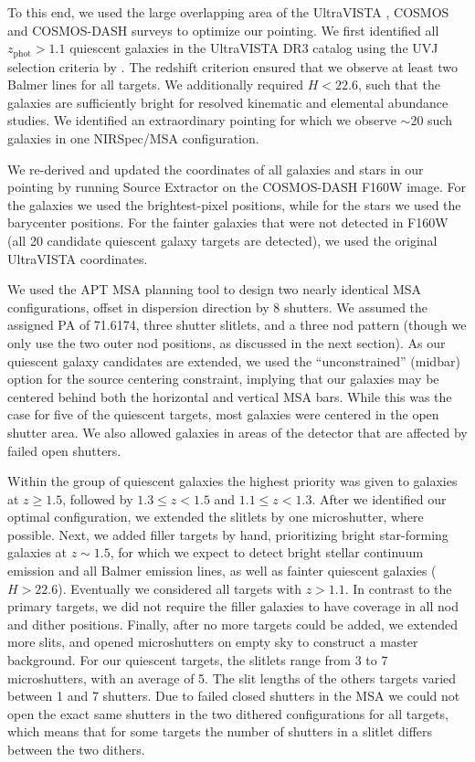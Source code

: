 \documentclass[twocolumn, astrosymb]{aastex631}
\begin{document}
To this end, we used the large overlapping area of the UltraVISTA 
\citep[][]{HMcCracken2012,AMuzzin2013b}, COSMOS \citep[F814W;][]{NScoville2007} and COSMOS-DASH \citep[F160W][]{LMowla2018,IMomcheva2017,SCutler2022} surveys to optimize our pointing. We first identified all $z_{\text{phot}}>1.1$ quiescent galaxies in the UltraVISTA DR3 catalog \citep{AMuzzin2013a} using the UVJ selection criteria by \citet{AMuzzin2013b}. The redshift criterion ensured that we observe at least two Balmer lines for all targets. We additionally required $H<22.6$, such that the galaxies are sufficiently bright for resolved kinematic and elemental abundance studies. We identified an extraordinary pointing for which we observe $\sim$20 such galaxies in one NIRSpec/MSA configuration.  

We re-derived and updated the coordinates of all galaxies and stars in our pointing by running Source Extractor \citep{EBertin1996} on the COSMOS-DASH F160W image. For the galaxies we used the brightest-pixel positions, while for the stars we used the barycenter positions. For the fainter galaxies that were not detected in F160W (all 20 candidate quiescent galaxy targets are detected), we used the original UltraVISTA coordinates.

We used the APT MSA planning tool to design two nearly identical MSA configurations, offset in dispersion direction by 8 shutters. We assumed the assigned PA of 71.6174\textdegree, three shutter slitlets, and a three nod pattern (though we only use the two outer nod positions, as discussed in the next section). As our quiescent galaxy candidates are extended, we used the ``unconstrained'' (midbar) option for the source centering constraint, implying that our galaxies may be centered behind both the horizontal and vertical MSA bars. While this was the case for five of the quiescent targets, most galaxies were centered in the open shutter area. We also allowed galaxies in areas of the detector that are affected by failed open shutters. 

Within the group of quiescent galaxies the highest priority was given to galaxies at $z\ge 1.5$, followed by $1.3\le z<1.5$ and $1.1\le z < 1.3$. After we identified our optimal configuration, we extended the slitlets by one microshutter, where possible. Next, we added filler targets by hand, prioritizing bright star-forming galaxies at $z\sim1.5$, for which we expect to detect bright stellar continuum emission and all Balmer emission lines, as well as fainter quiescent galaxies ($H>22.6$). Eventually we considered all targets with $z>1.1$. In contrast to the primary targets, we did not require the filler galaxies to have coverage in all nod and dither positions. Finally, after no more targets could be added, we extended more slits, and opened microshutters on empty sky to construct a master background. For our quiescent targets, the slitlets range from 3 to 7 microshutters, with an average of 5. The slit lengths of the others targets varied between 1 and 7 shutters. Due to failed closed shutters in the MSA we could not open the exact same shutters in the two dithered configurations for all targets, which means that for some targets the number of shutters in a slitlet differs between the two dithers. 
\end{document}
